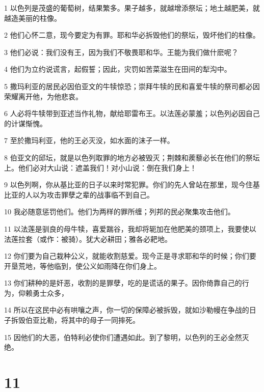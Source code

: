 \par 1 以色列是茂盛的葡萄树，结果繁多。果子越多，就越增添祭坛；地土越肥美，就越造美丽的柱像。
\par 2 他们心怀二意，现今要定为有罪。耶和华必拆毁他们的祭坛，毁坏他们的柱像。
\par 3 他们必说：我们没有王，因为我们不敬畏耶和华。王能为我们做什麽呢？
\par 4 他们为立约说谎言，起假誓；因此，灾罚如苦菜滋生在田间的犁沟中。
\par 5 撒玛利亚的居民必因伯亚文的牛犊惊恐；崇拜牛犊的民和喜爱牛犊的祭司都必因荣耀离开他，为他悲哀。
\par 6 人必将牛犊带到亚述当作礼物，献给耶雷布王。以法莲必蒙羞；以色列必因自己的计谋惭愧。
\par 7 至於撒玛利亚，他的王必灭没，如水面的沫子一样。
\par 8 伯亚文的邱坛，就是以色列取罪的地方必被毁灭；荆棘和蒺藜必长在他们的祭坛上。他们必对大山说：遮盖我们！对小山说：倒在我们身上！
\par 9 以色列啊，你从基比亚的日子以来时常犯罪。你们的先人曾站在那里，现今住基比亚的人以为攻击罪孽之辈的战事临不到自己。
\par 10 我必随意惩罚他们。他们为两样的罪所缠；列邦的民必聚集攻击他们。
\par 11 以法莲是驯良的母牛犊，喜爱踹谷，我却将轭加在他肥美的颈项上，我要使以法莲拉套（或作：被骑）。犹大必耕田；雅各必耙地。
\par 12 你们要为自己栽种公义，就能收割慈爱。现今正是寻求耶和华的时候；你们要开垦荒地，等他临到，使公义如雨降在你们身上。
\par 13 你们耕种的是奸恶，收割的是罪孽，吃的是谎话的果子。因你倚靠自己的行为，仰赖勇士众多，
\par 14 所以在这民中必有哄嚷之声，你一切的保障必被拆毁，就如沙勒幔在争战的日子拆毁伯亚比勒，将其中的母子一同摔死。
\par 15 因他们的大恶，伯特利必使你们遭遇如此。到了黎明，以色列的王必全然灭绝。

\chapter{11}

